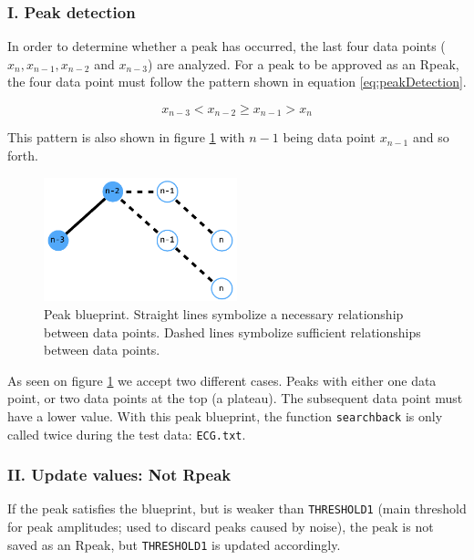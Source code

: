 \subsubsection*{I. Peak detection}
In order to determine whether a peak has occurred, the last four data points ($x_n, x_{n-1}, x_{n-2}$ and $x_{n-3}$) are analyzed. For a peak to be approved as an Rpeak, the four data point must follow the pattern shown in equation \ref{eq:peakDetection}.

\begin{equation} \label{eq:peakDetection}
    x_{n-3} < x_{n-2} \geq x_{n-1} > x_n
\end{equation}

This pattern is also shown in figure \ref{fig:peakDetection} with $n-1$ being data point $x_{n-1}$ and so forth.

\begin{figure}[H]
    \centering
            
        \includegraphics[width = 0.5\textwidth]{1Design/fig/peakReference.pdf}
        \caption{Peak blueprint. Straight lines symbolize a necessary relationship between data points. Dashed lines symbolize sufficient relationships between data points.}
        \label{fig:peakDetection}
\end{figure}

As seen on figure \ref{fig:peakDetection} we accept two different cases. Peaks with either one data point, or two data points at the top (a plateau). The subsequent data point must have a lower value. With this peak blueprint, the function \texttt{searchback} is only called twice during the test data: \texttt{ECG.txt}.

\subsubsection*{II. Update values: Not Rpeak}
If the peak satisfies the blueprint, but is weaker than \texttt{THRESHOLD1} (main threshold for peak amplitudes; used to discard peaks caused by noise), the peak is not saved as an Rpeak, but \texttt{THRESHOLD1} is updated accordingly. 

